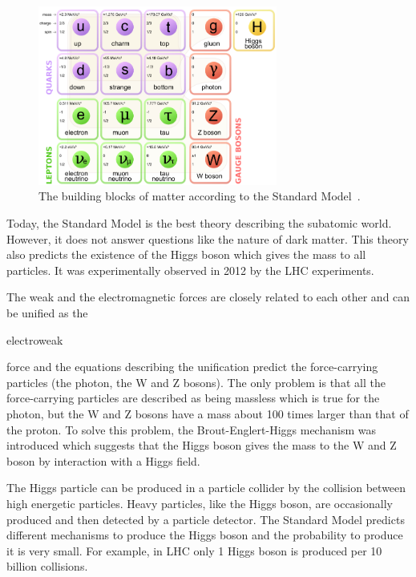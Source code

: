 \begin{figure}[htbp]
  \centering
  \includegraphics[width=0.7\textwidth]{figures/CLIC/StandardModel.png}
  \caption{The building blocks of matter according to the Standard
    Model~\cite{wikipediaParticles}.}
  \label{fig:standardmodel}
\end{figure}

Today, the Standard Model is the best theory describing the subatomic
world. However, it does not answer questions like the nature of dark
matter. This theory also predicts the existence of the Higgs boson
which gives the mass to all particles. It was experimentally observed
in 2012 by the LHC experiments.

The weak and the electromagnetic forces are closely related to each
other and can be unified as the \begin{it}electroweak\end{it} force
and the equations describing the unification predict the
force-carrying particles (the photon, the W and Z bosons). The only
problem is that all the force-carrying particles are described as
being massless which is true for the photon, but the W and Z bosons
have a mass about 100 times larger than that of the proton. To solve
this problem, the Brout-Englert-Higgs mechanism was introduced which
suggests that the Higgs boson gives the mass to the W and Z boson by
interaction with a Higgs field.

The Higgs particle can be produced in a particle collider by the
collision between high energetic particles. Heavy particles, like the
Higgs boson, are occasionally produced and then detected by a particle
detector. The Standard Model predicts different mechanisms to produce
the Higgs boson and the probability to produce it is very small. For
example, in LHC only 1 Higgs boson is produced per 10 billion
collisions.

